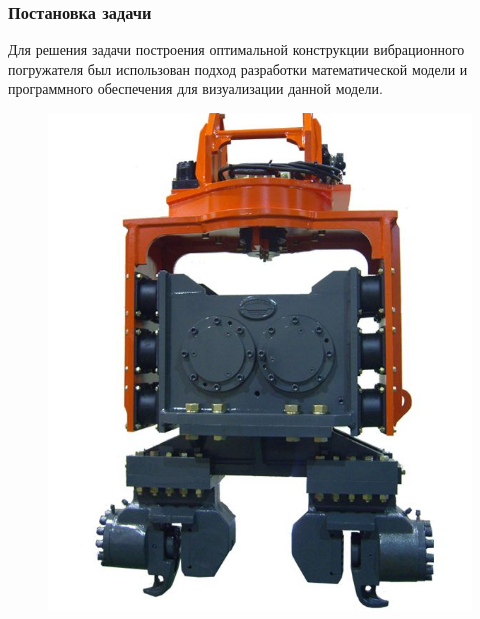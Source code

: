 \documentclass[10pt, pdf, hyperref={unicode}]{beamer}
\begin{document}
    \begin{frame}
        \frametitle{Постановка задачи}
        \begin{center}
            \begin{minipage}[h]{0.97\linewidth}
                \begin{minipage}[h]{0.95\linewidth}
                    Для решения задачи построения оптимальной конструкции вибрационного погружателя
                    был использован подход разработки математической модели и программного обеспечения для визуализации данной модели.
                    \newline\newline
                \end{minipage}
                \begin{minipage}[h]{0.22\linewidth}
                    \begin{figure}[h]
                        \centering
                        \includegraphics[width=1\linewidth]{../img/photo_1.jpg}
                    \end{figure}
                \end{minipage}

\end{minipage}
\end{center}
\end{frame}
\end{document}

